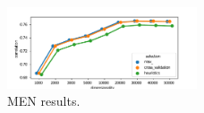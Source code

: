 \begin{figure}
  \centering

    \includegraphics[width=0.5\textwidth]{supplement/figures/men-results}
  \caption{MEN results.}
  \label{fig:men-results}
\end{figure}

